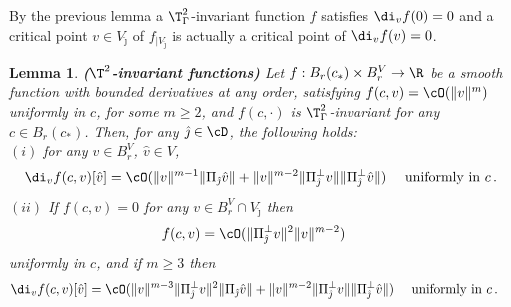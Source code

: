 \documentclass[11pt,a4paper,reqno]{article}
\numberwithin{equation}{section}
\newtheorem{lemma}[theorem]{Lemma}
\theoremstyle{definition}
\begin{document}
\begin{appendix}
By the  previous lemma a $ \T^2_\Gamma $-invariant function $ f $ satisfies  $\di_v f(0)=0$ and 
a critical point $v \in V_{\hat \jmath} $ of $ f_{|V_{\hat \jmath}}$ is actually a critical point of 
$ \di_v f (v) = 0 $. 
        \begin{lemma}\label{lm:A}
        {\bf (\texorpdfstring{$\T^2$-}{T^2_Gamma-}invariant functions)}
            Let $f:B_r(c_*)\times B_r^V\to \R$ be a  smooth function with bounded derivatives at any order,  
            satisfying $f(c,v)= \cO (\|v\|^m)$ uniformly in $ c $,   for some $m\geq 2$, 
and $ f(c, \cdot ) $ is              $\T^2_\Gamma$-invariant for any $ c \in B_r(c_*) $.             Then,  for any $ \hat \jmath \in \cD $, the following  holds:
\\[1mm]
$(i)$ 
            for any  $ v \in B_r^V $, $ \hat v \in V $, 
            \begin{equation}\label{A2ora}
                    \di_v f(c,v)[\hat v]= \cO(\|v\|^{m-1}\|\Pi_{\hat \jmath} \hat v\|+\|v\|^{m-2}\|\Pi_{\hat \jmath}^\bot v\|\| \Pi_{\hat \jmath}^\bot \hat v\| )
                    \quad
                    \text{ uniformly in} \ c \, . 
            \end{equation} 
$(ii)$ If   
            $
                f(c,v)=0 $ for any $ v\in B_r^V\cap V_{\hat \jmath}
            $
            then
            \begin{align}\label{eq:A1}
              &   f(c,v)= \cO (\|\Pi_{\hat \jmath}^\bot v\|^2 \|v\|^{m-2}) 
              \end{align}
            uniformly in $c$, 
            and if  $m\geq 3$ then
              \begin{align}
        & \label{eq:A3}
                \di_v f(c,v)[\hat v]= \cO (\|v\|^{m-3}\|\Pi_{\hat \jmath}^\bot v\|^2\|\Pi_{\hat \jmath} \hat v\|+\|v\|^{m-2}\|\Pi_{\hat \jmath}^\bot v\|\| \Pi_{\hat \jmath}^\bot \hat v\| )
            \quad
                    \text{ uniformly in} \ c \, .\end{align}
            
        \end{lemma}
        

\end{appendix}
\end{document}
